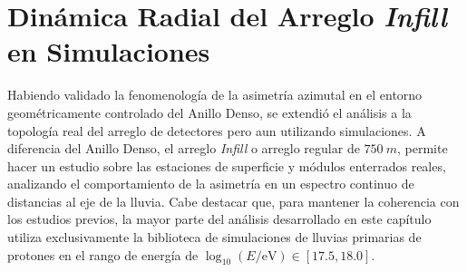 

\chapter{Dinámica Radial del Arreglo \textit{Infill} en Simulaciones}
\label{cap:infill}

Habiendo validado la fenomenología de la asimetría azimutal en el entorno geométricamente controlado del Anillo Denso, se extendió el análisis a la topología real del arreglo de detectores pero aun utilizando simulaciones. A diferencia del Anillo Denso, el arreglo \textit{Infill} o arreglo regular de $750~m$, permite hacer un estudio sobre las estaciones de superficie y módulos enterrados reales, analizando el comportamiento de la asimetría en un espectro continuo de distancias al eje de la lluvia. Cabe destacar que, para mantener la coherencia con los estudios previos, la mayor parte del análisis desarrollado en este capítulo utiliza exclusivamente la biblioteca de simulaciones de lluvias primarias de protones en el rango de energía de $\log_{10}(E/\mathrm{eV}) \in [17.5, 18.0]$.

